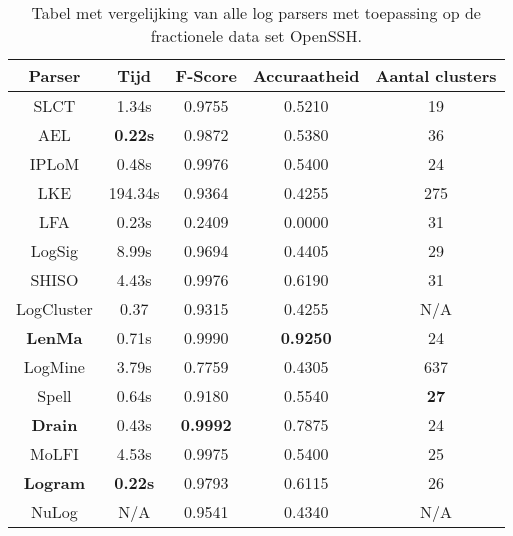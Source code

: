 \begin{table}[!htp]
    \caption{Tabel met vergelijking van alle log parsers met toepassing op de fractionele data set OpenSSH.}
    \label{table:OpenSSH}
    \begin{center}
        \begin{tabular}{||c | c | c | c | c||} 
            \hline
            Parser & Tijd & F-Score & Accuraatheid & Aantal clusters \\ [0.5ex] 
            \hline\hline
            SLCT & 1.34s & 0.9755 & 0.5210 & 19 \\
            
            AEL & \textbf{0.22s} & 0.9872 & 0.5380 & 36 \\ 
            
            IPLoM & 0.48s & 0.9976 & 0.5400 & 24 \\
            
            LKE & 194.34s & 0.9364 & 0.4255 & 275 \\
            
            LFA & 0.23s & 0.2409 & 0.0000 & 31 \\
            
            LogSig & 8.99s & 0.9694 & 0.4405 & 29 \\
            
            SHISO & 4.43s & 0.9976 & 0.6190 & 31 \\
            
            LogCluster & 0.37 & 0.9315 & 0.4255 & N/A \\
            
            \textbf{LenMa} & 0.71s & 0.9990 & \textbf{0.9250} & 24 \\
            
            LogMine & 3.79s & 0.7759 & 0.4305 & 637 \\
            
            Spell & 0.64s & 0.9180 & 0.5540 & \textbf{27} \\
            
            \textbf{Drain} & 0.43s & \textbf{0.9992} & 0.7875 & 24 \\
            
            MoLFI & 4.53s & 0.9975 & 0.5400 & 25 \\
            
            \textbf{Logram} & \textbf{0.22s} & 0.9793 & 0.6115 & 26 \\
            
            NuLog & N/A & 0.9541 & 0.4340 & N/A \\
            \hline
        \end{tabular}
    \end{center}
\end{table}

